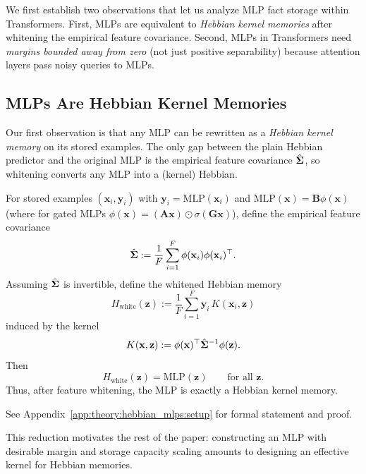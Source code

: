 We first establish two observations that let us analyze MLP fact storage within Transformers. First, MLPs are equivalent to \emph{Hebbian kernel memories} after whitening the empirical feature covariance. Second, MLPs in Transformers need \emph{margins bounded away from zero} (not just positive separability) because attention layers pass noisy queries to MLPs.

\subsection{MLPs Are Hebbian Kernel Memories}
\label{sec:mlps-are-hebbians}

Our first observation is that any MLP can be rewritten as a \emph{Hebbian kernel memory} on its stored examples. The only gap between the plain Hebbian predictor and the original MLP is the empirical feature covariance $\hat{{\bm{\Sigma}}}$, so whitening converts any MLP into a (kernel) Hebbian.


\begin{tcolorbox}[breakable,colback=white,colframe=blue!50!black,boxrule=1.5pt,arc=0mm,left=8pt,right=8pt,top=8pt,bottom=8pt,title={\small\bfseries Key Result: MLPs are Hebbian Memories},colbacktitle=blue!50!black,coltitle=white,titlerule=0.5pt]
\begin{theorem}\label{thm:mlp-hebb-whiten}
For stored examples $(\mathbf{x}_{i},\mathbf{y}_{i})$ with
$\mathbf{y}_{i}=\mathrm{MLP}(\mathbf{x}_{i})$ and
$\mathrm{MLP}(\mathbf{x})=\mathbf{B}\phi(\mathbf{x})$
(where for gated MLPs
$\phi(\mathbf{x})=(\mathbf{A}\mathbf{x})\odot \sigma(\mathbf{G}\mathbf{x})$),
define the empirical feature covariance
\[
\hat{{\bm{\Sigma}}}:=\frac1F\sum_{i=1}^F
\phi(\mathbf{x}_{i})\phi(\mathbf{x}_{i})^\top .
\]
Assuming $\hat{{\bm{\Sigma}}}$ is invertible, define the whitened Hebbian memory
\[
H_{\mathrm{white}}(\mathbf{z})
:=
\frac1F\sum_{i=1}^F
\mathbf{y}_{i}\,K(\mathbf{x}_{i},\mathbf{z})
\]
induced by the kernel
\[
K(\mathbf{x},\mathbf{z})
:=
\phi(\mathbf{x})^\top\hat{{\bm{\Sigma}}}^{-1}\phi(\mathbf{z}).
\]
Then
\[
H_{\mathrm{white}}(\mathbf{z})=\mathrm{MLP}(\mathbf{z})
\qquad \text{for all } \mathbf{z}.
\]
Thus, after feature whitening, the MLP is exactly a Hebbian kernel memory.
\end{theorem}
See Appendix~\ref{app:theory:hebbian_mlps:setup} for formal statement and proof. 
\end{tcolorbox}

This reduction motivates the rest of the paper:
constructing an MLP with desirable margin and storage capacity scaling amounts to designing an effective kernel for Hebbian memories.



